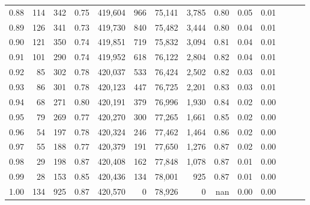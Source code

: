 \begin{tabular}{rrrrrrrrrrrrrr}
0.88 &     114 &    342 &  0.75 &  419,604 &      966 &  75,141 &   3,785 &  0.80 &  0.05 &      0.01 \\
0.89 &     126 &    341 &  0.73 &  419,730 &      840 &  75,482 &   3,444 &  0.80 &  0.04 &      0.01 \\
0.90 &     121 &    350 &  0.74 &  419,851 &      719 &  75,832 &   3,094 &  0.81 &  0.04 &      0.01 \\
0.91 &     101 &    290 &  0.74 &  419,952 &      618 &  76,122 &   2,804 &  0.82 &  0.04 &      0.01 \\
0.92 &      85 &    302 &  0.78 &  420,037 &      533 &  76,424 &   2,502 &  0.82 &  0.03 &      0.01 \\
0.93 &      86 &    301 &  0.78 &  420,123 &      447 &  76,725 &   2,201 &  0.83 &  0.03 &      0.01 \\
0.94 &      68 &    271 &  0.80 &  420,191 &      379 &  76,996 &   1,930 &  0.84 &  0.02 &      0.00 \\
0.95 &      79 &    269 &  0.77 &  420,270 &      300 &  77,265 &   1,661 &  0.85 &  0.02 &      0.00 \\
0.96 &      54 &    197 &  0.78 &  420,324 &      246 &  77,462 &   1,464 &  0.86 &  0.02 &      0.00 \\
0.97 &      55 &    188 &  0.77 &  420,379 &      191 &  77,650 &   1,276 &  0.87 &  0.02 &      0.00 \\
0.98 &      29 &    198 &  0.87 &  420,408 &      162 &  77,848 &   1,078 &  0.87 &  0.01 &      0.00 \\
0.99 &      28 &    153 &  0.85 &  420,436 &      134 &  78,001 &     925 &  0.87 &  0.01 &      0.00 \\
1.00 &     134 &    925 &  0.87 &  420,570 &        0 &  78,926 &       0 &   nan &  0.00 &      0.00 \\
\bottomrule
\end{tabular}
